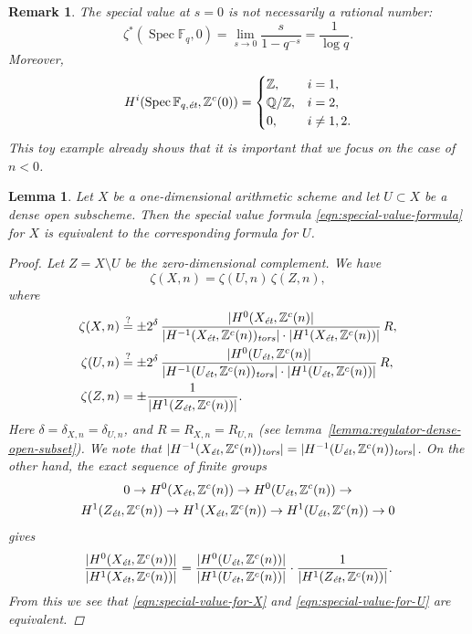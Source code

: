 \documentclass[draft]{article}
\DeclareMathOperator{\Spec}{Spec}
\newcommand{\FF}{\mathbb{F}}
\newcommand{\QQ}{\mathbb{Q}}
\newcommand{\ZZ}{\mathbb{Z}}
\newcommand{\et}{\text{\it \'{e}t}}
\newcommand{\tors}{\text{\it tors}}
\theoremstyle{myplain}
\newtheorem{lemma}[theorem]{Lemma}
\theoremstyle{mydefinition}
\newtheorem{remark}[theorem]{Remark}
\numberwithin{equation}{section}
\begin{document}
\begin{remark}
  The special value at $s = 0$ is not necessarily a rational number:
  \[ \zeta^* (\Spec \FF_q, 0) =
    \lim_{s \to 0} \frac{s}{1 - q^{-s}} =
    \frac{1}{\log q}. \]
  Moreover,
  \[ H^i (\Spec \FF_{q,\et}, \ZZ^c (0)) =
    \begin{cases}
      \ZZ, & i = 1, \\
      \QQ/\ZZ, & i = 2, \\
      0, & i \ne 1,2.
    \end{cases} \]
  This toy example already shows that it is important that we focus on the case
  of $n < 0$.
\end{remark}

\begin{lemma}
  \label{lemma:elementary-proof-2}
  Let $X$ be a one-dimensional arithmetic scheme and let $U \subset X$ be a
  dense open subscheme. Then the special value formula
  \eqref{eqn:special-value-formula} for $X$ is equivalent to the corresponding
  formula for $U$.

  \begin{proof}
    Let $Z = X\setminus U$ be the zero-dimensional complement. We have
    $$\zeta (X,n) = \zeta (U,n)\,\zeta (Z,n),$$
    where
    \begin{align}
      \label{eqn:special-value-for-X} \zeta (X,n) & \stackrel{?}{=} \pm 2^\delta\,\frac{|H^0 (X_\et, \ZZ^c (n)|}{|H^{-1} (X_\et, \ZZ^c (n))_\tors| \cdot |H^1 (X_\et, \ZZ^c (n))|}\,R, \\
      \label{eqn:special-value-for-U} \zeta (U,n) & \stackrel{?}{=} \pm 2^\delta\,\frac{|H^0 (U_\et, \ZZ^c (n)|}{|H^{-1} (U_\et, \ZZ^c (n))_\tors| \cdot |H^1 (U_\et, \ZZ^c (n))|}\,R, \\
      \notag \zeta (Z,n) & = \pm\frac{1}{|H^1 (Z_\et, \ZZ^c (n))|}.
    \end{align}
    Here $\delta = \delta_{X,n} = \delta_{U,n}$, and $R = R_{X,n} = R_{U,n}$
    (see lemma~\ref{lemma:regulator-dense-open-subset}). We note that
    $|H^{-1} (X_\et, \ZZ^c (n))_\tors| = |H^{-1} (U_\et, \ZZ^c (n))_\tors|$.
    On the other hand, the exact sequence of finite groups
    \begin{multline}
      0 \to H^0 (X_\et, \ZZ^c (n)) \to
      H^0 (U_\et, \ZZ^c (n)) \to \\
      H^1 (Z_\et, \ZZ^c (n)) \to
      H^1 (X_\et, \ZZ^c (n)) \to
      H^1 (U_\et, \ZZ^c (n)) \to 0
    \end{multline}
    gives
    \[ \frac{|H^0 (X_\et, \ZZ^c (n))|}{|H^1 (X_\et, \ZZ^c (n))|} =
      \frac{|H^0 (U_\et, \ZZ^c (n))|}{|H^1 (U_\et, \ZZ^c (n))|}\cdot
      \frac{1}{|H^1 (Z_\et, \ZZ^c (n))|}. \]
    From this we see that \eqref{eqn:special-value-for-X} and
    \eqref{eqn:special-value-for-U} are equivalent.
  \end{proof}
\end{lemma}
\end{document}
